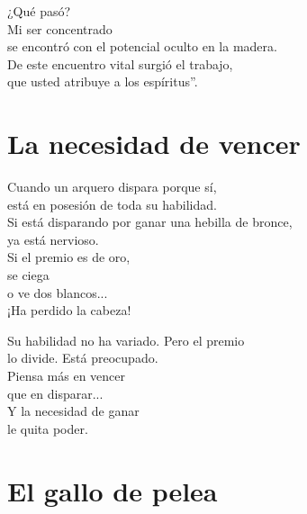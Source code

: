 \documentclass[book,b5paper,hidelinks,final]{memoir}
\begin{document}
	¿Qué pasó?\\
	Mi ser concentrado\\
	se encontró con el potencial oculto en la madera.\\
	De este encuentro vital surgió el trabajo,\\
	que usted atribuye a los espíritus''.
	
	\chapter*{La necesidad de vencer}
	
	Cuando un arquero dispara porque sí,\\
	está en posesión de toda su habilidad.\\
	Si está disparando por ganar una hebilla de bronce,\\
	ya está nervioso.\\
	Si el premio es de oro,\\
	se ciega\\
	o ve dos blancos...\\
	¡Ha perdido la cabeza!
	
	Su habilidad no ha variado. Pero el premio\\
	lo divide. Está preocupado.\\
	Piensa más en vencer\\
	que en disparar...\\
	Y la necesidad de ganar\\
	le quita poder.
	
	\chapter*{El gallo de pelea}
	
\end{document}
